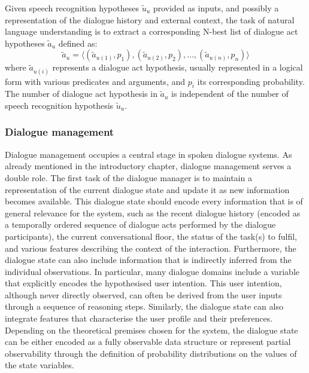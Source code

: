 Given speech recognition hypotheses $\tilde{u}_u$ provided as inputs, and possibly a representation of the dialogue history and external context, the task of natural language understanding is to extract a corresponding N-best list of dialogue act hypotheses $\tilde{a}_u$ defined as: \begin{equation*}
\tilde{a}_u = \langle (\tilde{a}_{u(1)}, p_{1}), (\tilde{a}_{u(2)}, p_{2}), \dots, (\tilde{a}_{u(n)}, p_{n})\rangle
\end{equation*}
where $\tilde{a}_{u(i)}$ represents a dialogue act hypothesis, usually represented in a logical form with various predicates and arguments, and $p_{i}$ its corresponding probability. The number of dialogue act hypothesis in $\tilde{a}_u$ is independent of the number of speech recognition hypothesis $\tilde{u}_u$. 

\subsubsection*{Dialogue management}

Dialogue management occupies a central stage in spoken dialogue systems.  As already mentioned in the introductory chapter, dialogue management serves a double role.  The first task of the dialogue manager is to maintain a representation of the current dialogue state and update it as new information becomes available. This dialogue state should encode every information that is of general relevance for the system, such as the recent dialogue history (encoded as a temporally ordered sequence of dialogue acts performed by the dialogue participants), the current conversational floor, the status of the task(s) to fulfil, and various features describing the context of the interaction.  Furthermore, the dialogue state can also include information that is indirectly inferred from the individual observations. In particular, many dialogue domains include a variable that explicitly encodes the hypothesised user intention.  This user intention, although never directly observed, can often be derived from the user inputs through a sequence of reasoning steps.  Similarly, the dialogue state can also integrate features that characterise the user profile and their preferences. Depending on the theoretical premises chosen for the system, the dialogue state can be either encoded as a fully observable data structure or represent partial observability through the definition of probability distributions on the values of the state variables. 

